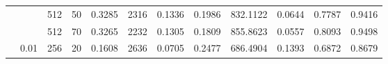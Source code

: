 \begin{table}[H]
{\begin{tabular}{llllrrrrrrrr}
	& & 512 & 50 & {\cellcolor[HTML]{0000FF}} \color[HTML]{F1F1F1} 0.3285 & {\cellcolor[HTML]{D8D8F4}} \color[HTML]{000000} 2316 & {\cellcolor[HTML]{0000FF}} \color[HTML]{F1F1F1} 0.1336 & {\cellcolor[HTML]{E4E4F3}} \color[HTML]{000000} 0.1986 & {\cellcolor[HTML]{0C0CFE}} \color[HTML]{F1F1F1} 832.1122 & {\cellcolor[HTML]{E9E9F3}} \color[HTML]{000000} 0.0644 & {\cellcolor[HTML]{2121FD}} \color[HTML]{F1F1F1} 0.7787 & {\cellcolor[HTML]{0707FF}} \color[HTML]{F1F1F1} 0.9416 \\ 
	& & 512 & 70 & {\cellcolor[HTML]{0101FF}} \color[HTML]{F1F1F1} 0.3265 & {\cellcolor[HTML]{E6E6F3}} \color[HTML]{000000} 2232 & {\cellcolor[HTML]{0707FF}} \color[HTML]{F1F1F1} 0.1305 & {\cellcolor[HTML]{F0F0F3}} \color[HTML]{000000} 0.1809 & {\cellcolor[HTML]{0000FF}} \color[HTML]{F1F1F1} 855.8623 & {\cellcolor[HTML]{EFEFF3}} \color[HTML]{000000} 0.0557 & {\cellcolor[HTML]{0C0CFE}} \color[HTML]{F1F1F1} 0.8093 & {\cellcolor[HTML]{0202FF}} \color[HTML]{F1F1F1} 0.9498 \\ \hhline{~|-|-|-|-|-|-|-|-|-|-|-|}
	& \multirow{6}{*}{0.01} & 256 & 20 & {\cellcolor[HTML]{9797F7}} \color[HTML]{F1F1F1} 0.1608 & {\cellcolor[HTML]{A5A5F7}} \color[HTML]{000000} 2636 & {\cellcolor[HTML]{9393F8}} \color[HTML]{F1F1F1} 0.0705 & {\cellcolor[HTML]{C0C0F5}} \color[HTML]{000000} 0.2477 & {\cellcolor[HTML]{5B5BFA}} \color[HTML]{F1F1F1} 686.4904 & {\cellcolor[HTML]{B6B6F6}} \color[HTML]{000000} 0.1393 & {\cellcolor[HTML]{5C5CFA}} \color[HTML]{F1F1F1} 0.6872 & {\cellcolor[HTML]{3131FD}} \color[HTML]{F1F1F1} 0.8679 \\ 

\end{tabular}}
\end{table}
